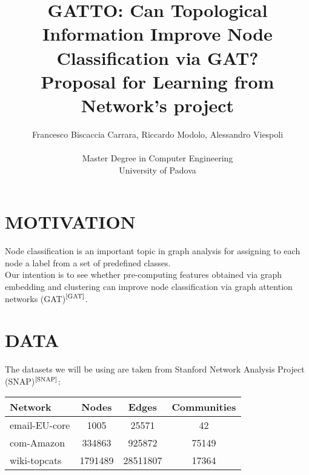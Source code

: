 \documentclass[12pt,conference]{ieeeconf} %
\title{GATTO: Can Topological Information Improve Node Classification via GAT?\\
\large Proposal for Learning from Network's project \\}
\author{Francesco Biscaccia Carrara, Riccardo Modolo, Alessandro Viespoli %
\\\\ Master Degree in Computer Engineering \\
University of Padova \\
}
\begin{document}
\maketitle
\thispagestyle{plain}
\pagestyle{plain}

\section{MOTIVATION} 
Node classification is an important topic in graph analysis for assigning to each node a label from a set of predefined classes. \\
Our intention is to see whether pre-computing features obtained via graph embedding and clustering can improve node classification via graph attention networks (GAT)$^\text{\cite{GAT}}$. 

\section{DATA}
The datasets we will be using are taken from Stanford Network Analysis Project (SNAP)$^\text{\cite{SNAP}}$: 
\begin{table}[h!]
\centering
\renewcommand{\arraystretch}{1.5}
\begin{tabular}{|l|c|c|c|}
\hline
\textbf{Network}           & \textbf{Nodes} & \textbf{Edges} & \textbf{Communities} \\
\hline
email-EU-core  & 1005           & 25571          & 42         \\
com-Amazon     & 334863         & 925872         & 75149    \\
wiki-topcats        & 1791489        & 28511807       & 17364    \\
\hline
\end{tabular}
\end{table}
\end{document}
